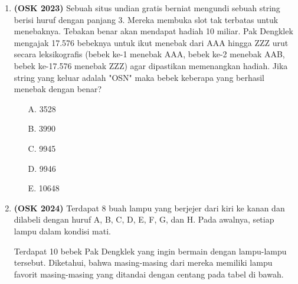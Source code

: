 \documentclass[a4paper]{article}
\begin{document}
\begin{enumerate}
    \item \textbf{(OSK 2023)} Sebuah situs undian gratis berniat mengundi sebuah string berisi huruf dengan panjang 3. 
    Mereka membuka slot tak terbatas untuk menebaknya. Tebakan benar akan mendapat hadiah 10 miliar. 
    Pak Dengklek mengajak 17.576 bebeknya untuk ikut menebak dari AAA hingga ZZZ urut secara leksikografis 
    (bebek ke-1 menebak AAA, bebek ke-2 menebak AAB, bebek ke-17.576 menebak ZZZ) agar dipastikan memenangkan hadiah. 
    Jika string yang keluar adalah "OSN" maka bebek keberapa yang berhasil menebak dengan benar?
    \begin{itemize}
        \item[A.] 3528
        \item[B.] 3990
        \item[C.] 9945
        \item[D.] 9946
        \item[E.] 10648
    \end{itemize}

    \item \textbf{(OSK 2024)} Terdapat 8 buah lampu yang berjejer dari kiri ke kanan dan dilabeli dengan huruf A, B, C, D, E, F, G, dan H. Pada awalnya, setiap lampu dalam kondisi mati.

    Terdapat 10 bebek Pak Dengklek yang ingin bermain dengan lampu-lampu tersebut. Diketahui, bahwa masing-masing dari mereka memiliki lampu favorit masing-masing yang ditandai dengan centang pada tabel di bawah.
    

\end{enumerate}
\end{document}
